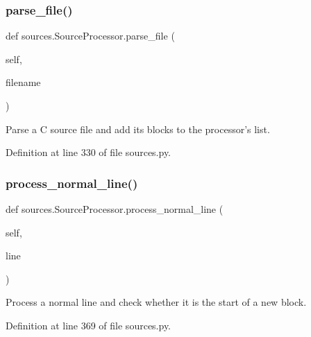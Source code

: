 \subsubsection{\texorpdfstring{parse\+\_\+file()}{parse\_file()}}
{\footnotesize\ttfamily def sources.\+Source\+Processor.\+parse\+\_\+file (\begin{DoxyParamCaption}\item[{}]{self,  }\item[{}]{filename }\end{DoxyParamCaption})}

\begin{DoxyVerb}Parse a C source file and add its blocks to the processor's
   list.\end{DoxyVerb}
 

Definition at line 330 of file sources.\+py.

\mbox{\label{classsources_1_1_source_processor_a2b1c60d8bc9d94bb958e04019baafea3}} 
\subsubsection{\texorpdfstring{process\+\_\+normal\+\_\+line()}{process\_normal\_line()}}
{\footnotesize\ttfamily def sources.\+Source\+Processor.\+process\+\_\+normal\+\_\+line (\begin{DoxyParamCaption}\item[{}]{self,  }\item[{}]{line }\end{DoxyParamCaption})}

\begin{DoxyVerb}Process a normal line and check whether it is the start of a new
   block.\end{DoxyVerb}
 

Definition at line 369 of file sources.\+py.

\mbox{\label{classsources_1_1_source_processor_a367b849e7abce1219f2c14a9c8fda0ca}} 

